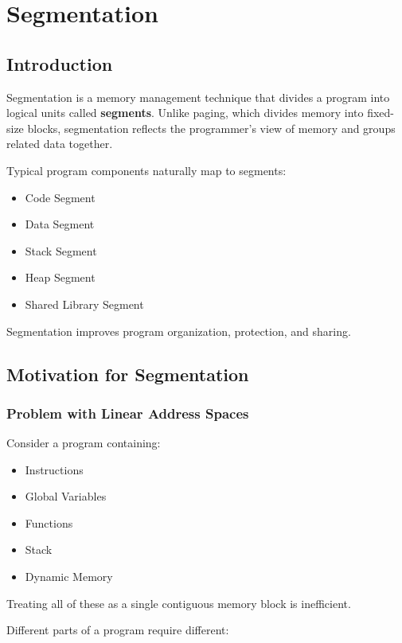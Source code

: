 \chapter{Segmentation}

\section{Introduction}

Segmentation is a memory management technique that divides a program into logical units called \textbf{segments}. Unlike paging, which divides memory into fixed-size blocks, segmentation reflects the programmer's view of memory and groups related data together.

Typical program components naturally map to segments:

\begin{itemize}
\item Code Segment
\item Data Segment
\item Stack Segment
\item Heap Segment
\item Shared Library Segment
\end{itemize}

Segmentation improves program organization, protection, and sharing.

\section{Motivation for Segmentation}

\subsection{Problem with Linear Address Spaces}

Consider a program containing:

\begin{itemize}
\item Instructions
\item Global Variables
\item Functions
\item Stack
\item Dynamic Memory
\end{itemize}

Treating all of these as a single contiguous memory block is inefficient.

Different parts of a program require different:

